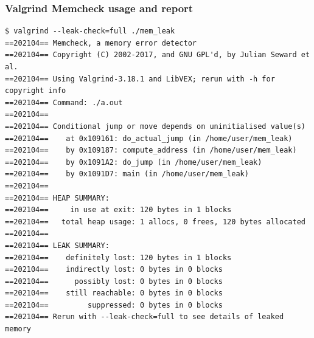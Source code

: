 \begin{frame}[fragile]
  \frametitle{Valgrind Memcheck usage and report}
  \begin{block}{}
    \begin{verbatim}
$ valgrind --leak-check=full ./mem_leak
==202104== Memcheck, a memory error detector
==202104== Copyright (C) 2002-2017, and GNU GPL'd, by Julian Seward et al.
==202104== Using Valgrind-3.18.1 and LibVEX; rerun with -h for copyright info
==202104== Command: ./a.out
==202104==
==202104== Conditional jump or move depends on uninitialised value(s)
==202104==    at 0x109161: do_actual_jump (in /home/user/mem_leak)
==202104==    by 0x109187: compute_address (in /home/user/mem_leak)
==202104==    by 0x1091A2: do_jump (in /home/user/mem_leak)
==202104==    by 0x1091D7: main (in /home/user/mem_leak)
==202104==
==202104== HEAP SUMMARY:
==202104==     in use at exit: 120 bytes in 1 blocks
==202104==   total heap usage: 1 allocs, 0 frees, 120 bytes allocated
==202104==
==202104== LEAK SUMMARY:
==202104==    definitely lost: 120 bytes in 1 blocks
==202104==    indirectly lost: 0 bytes in 0 blocks
==202104==      possibly lost: 0 bytes in 0 blocks
==202104==    still reachable: 0 bytes in 0 blocks
==202104==         suppressed: 0 bytes in 0 blocks
==202104== Rerun with --leak-check=full to see details of leaked memory
    \end{verbatim}
  \end{block}
\end{frame}


